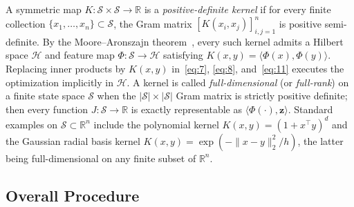 \documentclass[11pt,letterpaper]{article}
\newcommand{\R}{\mathbb{R}}
\newcommand{\ip}[2]{\langle #1, #2\rangle}
\newcommand{\norm}[1]{\lVert #1\rVert}
\theoremstyle{definition}
\begin{document}
A symmetric map $K:\mathcal{S}\times\mathcal{S}\to\R$ is a \emph{positive-definite kernel} if for every finite collection $\{x_1,\ldots,x_n\}\subset\mathcal{S}$, the Gram matrix $[K(x_i,x_j)]_{i,j=1}^n$ is positive semi-definite. By the Moore--Aronszajn theorem~\cite{ScholkopfSmola01}, every such kernel admits a Hilbert space $\mathcal{H}$ and feature map $\Phi:\mathcal{S}\to\mathcal{H}$ satisfying $K(x,y) = \ip{\Phi(x)}{\Phi(y)}$. Replacing inner products by $K(x,y)$ in~\eqref{eq:7}, \eqref{eq:8}, and~\eqref{eq:11} executes the optimization implicitly in $\mathcal{H}$. A kernel is called \emph{full-dimensional} (or \emph{full-rank}) on a finite state space $\mathcal{S}$ when the $|\mathcal{S}|\times|\mathcal{S}|$ Gram matrix is strictly positive definite; then every function $J:\mathcal{S}\to\R$ is exactly representable as $\ip{\Phi(\cdot)}{\mathbf{z}}$. Standard examples on $\mathcal{S}\subset\R^n$ include the polynomial kernel $K(x,y) = (1 + x^\top y)^d$ and the Gaussian radial basis kernel $K(x,y) = \exp(-\norm{x-y}_2^2/h)$, the latter being full-dimensional on any finite subset of $\R^n$.

\subsection{Overall Procedure}
\label{sec:procedure}
\end{document}
